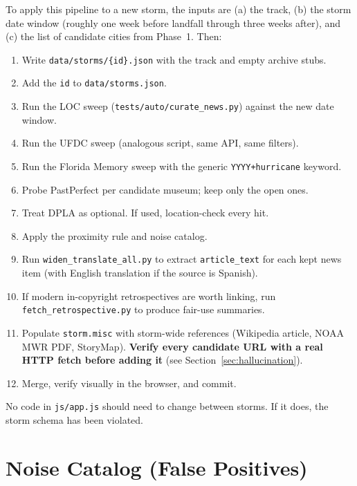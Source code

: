 \documentclass[11pt,letterpaper]{article}
\begin{document}
To apply this pipeline to a new storm, the inputs are (a) the track, (b) the storm date window (roughly one week before landfall through three weeks after), and (c) the list of candidate cities from Phase~1. Then:

\begin{enumerate}[leftmargin=1.5em]
  \item Write \texttt{data/storms/\{id\}.json} with the track and empty archive stubs.
  \item Add the \texttt{id} to \texttt{data/storms.json}.
  \item Run the LOC sweep (\texttt{tests/auto/curate\_news.py}) against the new date window.
  \item Run the UFDC sweep (analogous script, same API, same filters).
  \item Run the Florida Memory sweep with the generic \texttt{YYYY+hurricane} keyword.
  \item Probe PastPerfect per candidate museum; keep only the open ones.
  \item Treat DPLA as optional. If used, location-check every hit.
  \item Apply the proximity rule and noise catalog.
  \item Run \texttt{widen\_translate\_all.py} to extract \texttt{article\_text} for each kept news item (with English translation if the source is Spanish).
  \item If modern in-copyright retrospectives are worth linking, run \texttt{fetch\_retrospective.py} to produce fair-use summaries.
  \item Populate \texttt{storm.misc} with storm-wide references (Wikipedia article, NOAA MWR PDF, StoryMap). \textbf{Verify every candidate URL with a real HTTP fetch before adding it} (see Section~\ref{sec:hallucination}).
  \item Merge, verify visually in the browser, and commit.
\end{enumerate}

No code in \texttt{js/app.js} should need to change between storms. If it does, the storm schema has been violated.

\appendix
\section{Noise Catalog (False Positives)}
\end{document}
